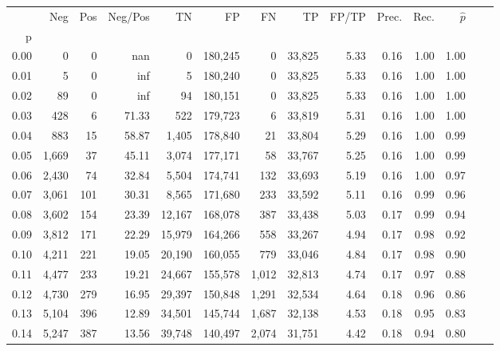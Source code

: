 \begin{tabular}{rrrrrrrrrrrrrr}
\toprule
{} &    Neg &  Pos & Neg/Pos &       TN &       FP &      FN &      TP & FP/TP & Prec. &  Rec. & $\hat{p}$ \\
p    &        &      &         &          &          &         &         &       &       &       &           \\
\midrule
0.00 &      0 &    0 &     nan &        0 &  180,245 &       0 &  33,825 &  5.33 &  0.16 &  1.00 &      1.00 \\
0.01 &      5 &    0 &     inf &        5 &  180,240 &       0 &  33,825 &  5.33 &  0.16 &  1.00 &      1.00 \\
0.02 &     89 &    0 &     inf &       94 &  180,151 &       0 &  33,825 &  5.33 &  0.16 &  1.00 &      1.00 \\
0.03 &    428 &    6 &   71.33 &      522 &  179,723 &       6 &  33,819 &  5.31 &  0.16 &  1.00 &      1.00 \\
0.04 &    883 &   15 &   58.87 &    1,405 &  178,840 &      21 &  33,804 &  5.29 &  0.16 &  1.00 &      0.99 \\
0.05 &  1,669 &   37 &   45.11 &    3,074 &  177,171 &      58 &  33,767 &  5.25 &  0.16 &  1.00 &      0.99 \\
0.06 &  2,430 &   74 &   32.84 &    5,504 &  174,741 &     132 &  33,693 &  5.19 &  0.16 &  1.00 &      0.97 \\
0.07 &  3,061 &  101 &   30.31 &    8,565 &  171,680 &     233 &  33,592 &  5.11 &  0.16 &  0.99 &      0.96 \\
0.08 &  3,602 &  154 &   23.39 &   12,167 &  168,078 &     387 &  33,438 &  5.03 &  0.17 &  0.99 &      0.94 \\
0.09 &  3,812 &  171 &   22.29 &   15,979 &  164,266 &     558 &  33,267 &  4.94 &  0.17 &  0.98 &      0.92 \\
0.10 &  4,211 &  221 &   19.05 &   20,190 &  160,055 &     779 &  33,046 &  4.84 &  0.17 &  0.98 &      0.90 \\
0.11 &  4,477 &  233 &   19.21 &   24,667 &  155,578 &   1,012 &  32,813 &  4.74 &  0.17 &  0.97 &      0.88 \\
0.12 &  4,730 &  279 &   16.95 &   29,397 &  150,848 &   1,291 &  32,534 &  4.64 &  0.18 &  0.96 &      0.86 \\
0.13 &  5,104 &  396 &   12.89 &   34,501 &  145,744 &   1,687 &  32,138 &  4.53 &  0.18 &  0.95 &      0.83 \\
0.14 &  5,247 &  387 &   13.56 &   39,748 &  140,497 &   2,074 &  31,751 &  4.42 &  0.18 &  0.94 &      0.80 \\

\end{tabular}

